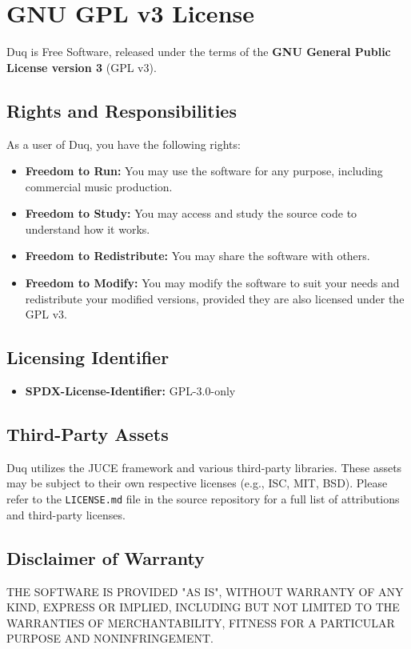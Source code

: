 \chapter{GNU GPL v3 License}
\label{ch:licensing}

Duq is Free Software, released under the terms of the \textbf{GNU General Public License version 3} (GPL v3).

\section{Rights and Responsibilities}
As a user of Duq, you have the following rights:
\begin{itemize}
    \item \textbf{Freedom to Run:} You may use the software for any purpose, including commercial music production.
    \item \textbf{Freedom to Study:} You may access and study the source code to understand how it works.
    \item \textbf{Freedom to Redistribute:} You may share the software with others.
    \item \textbf{Freedom to Modify:} You may modify the software to suit your needs and redistribute your modified versions, provided they are also licensed under the GPL v3.
\end{itemize}

\section{Licensing Identifier}
\begin{itemize}
    \item \textbf{SPDX-License-Identifier:} GPL-3.0-only
\end{itemize}

\section{Third-Party Assets}
Duq utilizes the JUCE framework and various third-party libraries. These assets may be subject to their own respective licenses (e.g., ISC, MIT, BSD). Please refer to the \texttt{LICENSE.md} file in the source repository for a full list of attributions and third-party licenses.

\section{Disclaimer of Warranty}
THE SOFTWARE IS PROVIDED "AS IS", WITHOUT WARRANTY OF ANY KIND, EXPRESS OR IMPLIED, INCLUDING BUT NOT LIMITED TO THE WARRANTIES OF MERCHANTABILITY, FITNESS FOR A PARTICULAR PURPOSE AND NONINFRINGEMENT.
